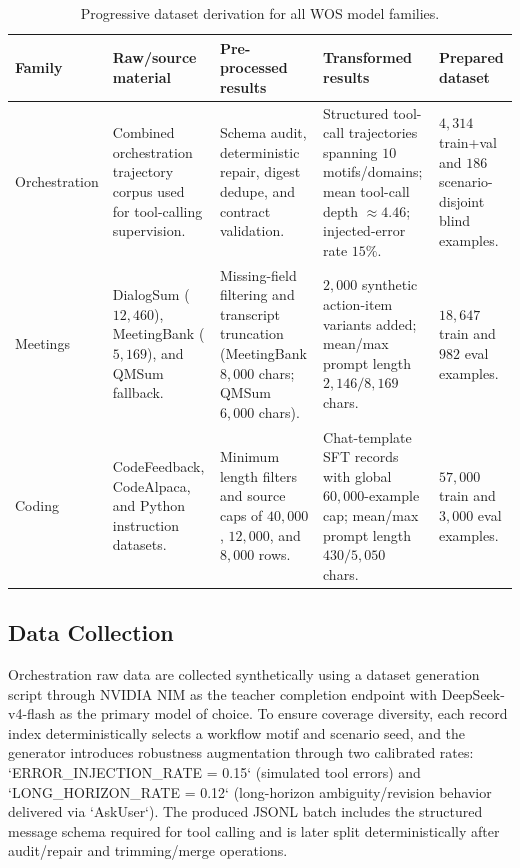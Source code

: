 \documentclass[conference]{IEEEtran}
\begin{document}
\begin{table}[!t]
\caption{Progressive dataset derivation for all WOS model families.}
\label{tab:wos_dataset_overview}
\centering
\footnotesize
\setlength{\tabcolsep}{5pt}
\begin{tabularx}{\textwidth}{l X X X X}
\toprule
Family & Raw/source material & Pre-processed results & Transformed results & Prepared dataset \\
\midrule
Orchestration &
Combined orchestration trajectory corpus used for tool-calling supervision. &
Schema audit, deterministic repair, digest dedupe, and contract validation. &
Structured tool-call trajectories spanning \(10\) motifs/domains; mean tool-call depth \(\approx4.46\); injected-error rate \(15\%\). &
\(4{,}314\) train+val and \(186\) scenario-disjoint blind examples. \\
\addlinespace
Meetings &
DialogSum (\(12{,}460\)), MeetingBank (\(5{,}169\)), and QMSum fallback. &
Missing-field filtering and transcript truncation (MeetingBank \(8{,}000\) chars; QMSum \(6{,}000\) chars). &
\(2{,}000\) synthetic action-item variants added; mean/max prompt length \(2{,}146/8{,}169\) chars. &
\(18{,}647\) train and \(982\) eval examples. \\
\addlinespace
Coding &
CodeFeedback, CodeAlpaca, and Python instruction datasets. &
Minimum length filters and source caps of \(40{,}000\), \(12{,}000\), and \(8{,}000\) rows. &
Chat-template SFT records with global \(60{,}000\)-example cap; mean/max prompt length \(430/5{,}050\) chars. &
\(57{,}000\) train and \(3{,}000\) eval examples. \\
\bottomrule
\end{tabularx}
\end{table}

\subsection{Data Collection}
Orchestration raw data are collected synthetically using a dataset generation script through NVIDIA NIM as the teacher completion endpoint with DeepSeek-v4-flash as the primary model of choice. To ensure coverage diversity, each record index deterministically selects a workflow motif and scenario seed, and the generator introduces robustness augmentation through two calibrated rates: `ERROR\_INJECTION\_RATE = 0.15` (simulated tool errors) and `LONG\_HORIZON\_RATE = 0.12` (long-horizon ambiguity/revision behavior delivered via `AskUser`). The produced JSONL batch includes the structured message schema required for tool calling and is later split deterministically after audit/repair and trimming/merge operations.
\end{document}
